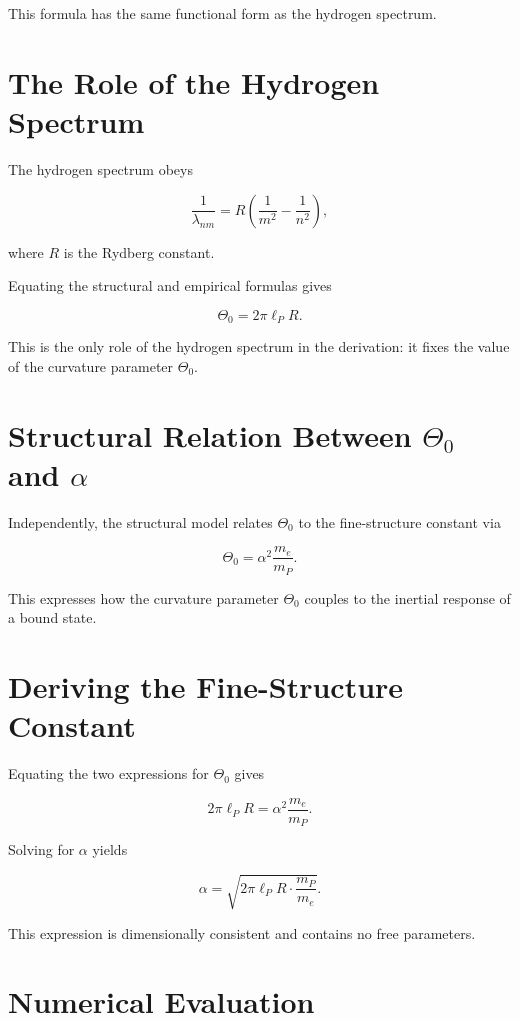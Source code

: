 \documentclass[11pt,a4paper]{article}
\begin{document}
This formula has the same functional form as the hydrogen spectrum.

\section{The Role of the Hydrogen Spectrum}

The hydrogen spectrum obeys


\[
\frac{1}{\lambda_{nm}}
=
R\left(\frac{1}{m^2} - \frac{1}{n^2}\right),
\]


where $R$ is the Rydberg constant.

Equating the structural and empirical formulas gives


\[
\Theta_0 = 2\pi \ell_P R.
\]



This is the only role of the hydrogen spectrum in the derivation: it fixes the value of the curvature parameter $\Theta_0$.

\section{Structural Relation Between $\Theta_0$ and $\alpha$}

Independently, the structural model relates $\Theta_0$ to the fine-structure constant via


\[
\Theta_0 = \alpha^2 \frac{m_e}{m_P}.
\]



This expresses how the curvature parameter $\Theta_0$ couples to the inertial response of a bound state.

\section{Deriving the Fine-Structure Constant}

Equating the two expressions for $\Theta_0$ gives


\[
2\pi \ell_P R
=
\alpha^2 \frac{m_e}{m_P}.
\]



Solving for $\alpha$ yields


\[
\alpha
=
\sqrt{
2\pi \ell_P R \cdot \frac{m_P}{m_e}
}.
\]



This expression is dimensionally consistent and contains no free parameters.

\section{Numerical Evaluation}
\end{document}
